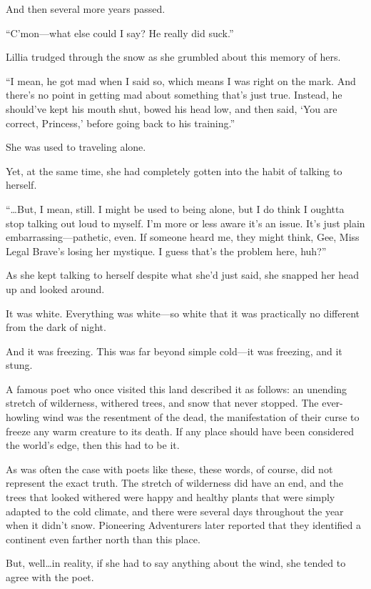 And then several more years passed.

“C’mon—what else could I say? He really did suck.”

Lillia trudged through the snow as she grumbled about this memory of hers.

“I mean, he got mad when I said so, which means I was right on the mark. And there’s no point in getting mad about something that’s just true. Instead, he should’ve kept his mouth shut, bowed his head low, and then said, ‘You are correct, Princess,’ before going back to his training.”

She was used to traveling alone.

Yet, at the same time, she had completely gotten into the habit of talking to herself.

“…But, I mean, still. I might be used to being alone, but I do think I oughtta stop talking out loud to myself. I’m more or less aware it’s an issue. It’s just plain embarrassing—pathetic, even. If someone heard me, they might think, Gee, Miss Legal Brave’s losing her mystique. I guess that’s the problem here, huh?”

As she kept talking to herself despite what she’d just said, she snapped her head up and looked around.

It was white. Everything was white—so white that it was practically no different from the dark of night.

And it was freezing. This was far beyond simple cold—it was freezing, and it stung.

A famous poet who once visited this land described it as follows: an unending stretch of wilderness, withered trees, and snow that never stopped. The ever-howling wind was the resentment of the dead, the manifestation of their curse to freeze any warm creature to its death. If any place should have been considered the world’s edge, then this had to be it.

As was often the case with poets like these, these words, of course, did not represent the exact truth. The stretch of wilderness did have an end, and the trees that looked withered were happy and healthy plants that were simply adapted to the cold climate, and there were several days throughout the year when it didn’t snow. Pioneering Adventurers later reported that they identified a continent even farther north than this place.

But, well…in reality, if she had to say anything about the wind, she tended to agree with the poet.

